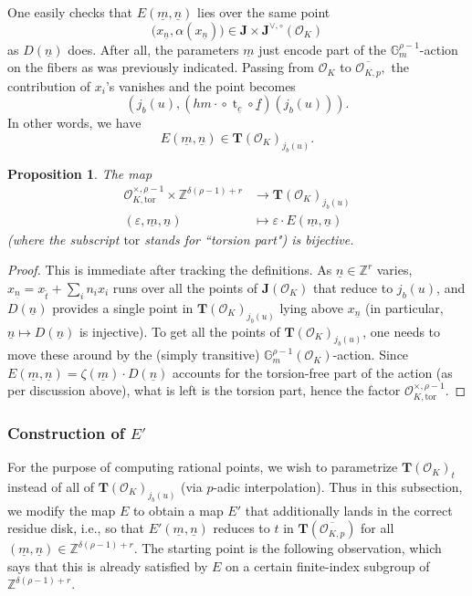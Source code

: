 \documentclass[11pt,oneside]{amsart}
\theoremstyle{plain}
\newtheorem{proposition}[theorem]{Proposition}
\theoremstyle{definition}
\def\G{{\bf G}}
\DeclareMathOperator{\tr}{t}
\def\TT{\mathbf{T}}
\def\Z{\mathbb{Z}}
\def\J{\mathbf{J}}
\def\Jo{\mathbf{J}^{\vee,\circ}}
\def\G{\mathbb{G}}
\def\oh{\mathcal{O}}
\begin{document}
One easily checks that $E(\underline{m}, \underline{n})$ lies over the same point 
$$\big(x_{\underline{n}}, \alpha(x_{\underline{n}})\big) \in \J\times \Jo(\oh_K)$$ as $D(\underline{n})$ does. After all, the parameters $\underline{m}$ just encode part of the $\G_m^{\rho-1}$-action on the fibers as was previously indicated. Passing from $\oh_K$ to $\overline{\oh_{K, p}},$ the contribution of $x_i$'s vanishes and the point becomes 
$$(j_b(u), ({hm\cdot}\circ \tr_{\underline{c}}\circ \underline{f})(j_b(u))).$$ In other words, we have 
$$E(\underline{m}, \underline{n}) \in \TT(\oh_K)_{j_b(u)}.$$


\begin{proposition}\label{prop:bijective-E}
The map
\begin{align*}
\oh_{K, \mathrm{tor}}^{\times, \rho-1}\times \Z^{\delta(\rho-1)+r} & \longrightarrow \TT(\oh_K)_{j_b(u)} \\
(\varepsilon, \underline{m}, \underline{n}) &\longmapsto  \varepsilon \cdot E(\underline{m}, \underline{n})
\end{align*}
(where the subscript $\mathrm{tor}$ stands for ``torsion part") is bijective.
\end{proposition}
\begin{proof}
This is immediate after tracking the definitions. As $\underline{n} \in \Z^r$ varies, $x_{\underline{n}}=x_{\tilde {t}}+\sum_i n_ix_i$ runs over all the points of $\J(\oh_K)$ that reduce to $j_b(u)$, and $D(\underline{n})$ provides a single  point in $\TT(\oh_K)_{j_b(u)}$ lying above $x_{\underline{n}}$ (in particular, $\underline{n} \mapsto D(\underline{n})$ is injective). To get all the points of $\TT(\oh_K)_{j_b(u)}$, one needs to move these around by the (simply transitive) $\G_m^{\rho-1}(\oh_K)$-action. Since $E(\underline{m}, \underline{n})=\zeta(\underline{m})\cdot D(\underline{n})$ accounts for the torsion-free part of the action (as per discussion above), what is left is the torsion part, hence the factor $\oh_{K, \mathrm{tor}}^{\times, \rho-1}$.
\end{proof}

\subsubsection{Construction of $E'$}\label{ss:Eprime}

For the purpose of computing rational points, we wish to parametrize $\TT(\oh_K)_t$ instead of all of $\TT(\oh_K)_{j_b(u)}$ (via $p$-adic interpolation). Thus in this subsection, we modify the map $E$ to obtain a map $E'$ that additionally lands in the correct residue disk, i.e., so that $E'(\underline{m}, \underline{n})$ reduces to $t$ in $\TT(\overline{\oh_{K, p}})$ for all $(\underline{m}, \underline{n}) \in \Z^{\delta(\rho-1)+r}$. The starting point is the following observation, which says that this is already satisfied by $E$ on a certain finite-index subgroup of $\Z^{\delta(\rho-1)+r}$. 
\end{document}
